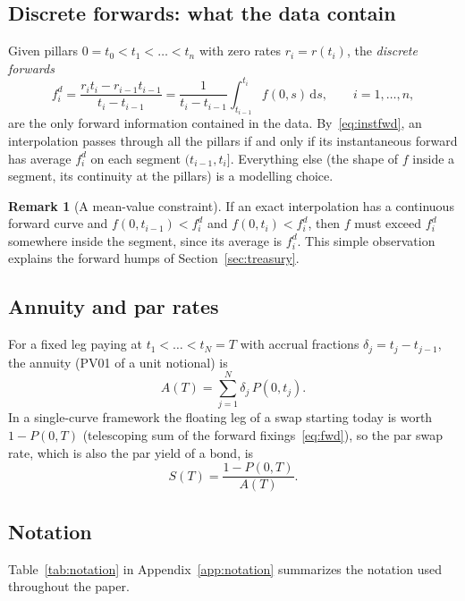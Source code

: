 \documentclass[11pt,a4paper]{article}
\theoremstyle{plain}
\theoremstyle{definition}
\newtheorem{remark}[theorem]{Remark}
\newcommand{\dd}{\mathrm{d}}
\begin{document}
\subsection{Discrete forwards: what the data contain}
Given pillars $0=t_0<t_1<\dots<t_n$ with zero rates $r_i=r(t_i)$, the \emph{discrete forwards}
\begin{equation}
    f^d_i=\frac{r_it_i-r_{i-1}t_{i-1}}{t_i-t_{i-1}}=\frac{1}{t_i-t_{i-1}}\int_{t_{i-1}}^{t_i}f(0,s)\,\dd s, \qquad i=1,\dots,n,
    \label{eq:discrete-fwd}
\end{equation}
are the only forward information contained in the data. By~\eqref{eq:instfwd}, an interpolation passes through all the pillars if and only if its instantaneous forward has average $f^d_i$ on each segment $(t_{i-1},t_i]$. Everything else (the shape of $f$ inside a segment, its continuity at the pillars) is a modelling choice.

\begin{remark}[A mean-value constraint]\label{rem:mean}
If an exact interpolation has a continuous forward curve and $f(0,t_{i-1})<f^d_i$ and $f(0,t_i)<f^d_i$, then $f$ must exceed $f^d_i$ somewhere inside the segment, since its average is $f^d_i$. This simple observation explains the forward humps of Section~\ref{sec:treasury}.
\end{remark}

\subsection{Annuity and par rates}
For a fixed leg paying at $t_1<\dots<t_N=T$ with accrual fractions $\delta_j=t_j-t_{j-1}$, the annuity (PV01 of a unit notional) is
\begin{equation}
    A(T)=\sum_{j=1}^{N}\delta_j\,P(0,t_j).
    \label{eq:annuity}
\end{equation}
In a single-curve framework the floating leg of a swap starting today is worth $1-P(0,T)$ (telescoping sum of the forward fixings~\eqref{eq:fwd}), so the par swap rate, which is also the par yield of a bond, is
\begin{equation}
    S(T)=\frac{1-P(0,T)}{A(T)}.
    \label{eq:par}
\end{equation}

\subsection{Notation}
Table~\ref{tab:notation} in Appendix~\ref{app:notation} summarizes the notation used throughout the paper.
\end{document}
